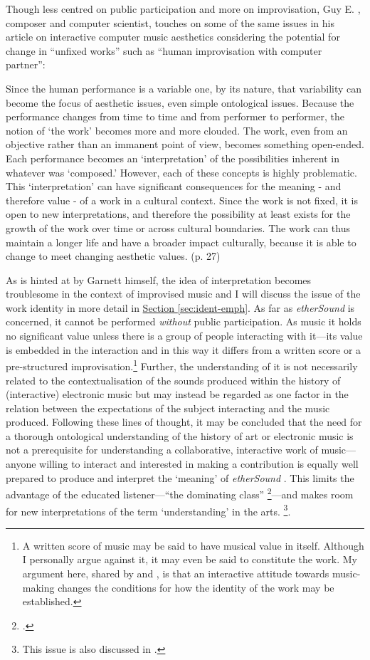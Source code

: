 Though less centred on public participation and more on improvisation, Guy E. \citeauthor{Garnett}, composer and computer scientist, touches on some of the same issues in his article on interactive computer music aesthetics considering the potential for change in ``unfixed works'' such as ``human improvisation with computer partner'': 
\begin{squote}   
Since the human performance is a variable one, by its nature, that  variability can become the focus of aesthetic issues, even simple  ontological issues. Because the performance changes from time to  time and from performer to performer, the notion of `the work'  becomes more and more clouded. The work, even from an objective  rather than an immanent point of view, becomes something open-ended.  Each performance becomes an `interpretation' of the possibilities  inherent in whatever was `composed.' However, each of these concepts  is highly problematic. This `interpretation' can have significant  consequences for the meaning - and therefore value - of a work in a  cultural context. Since the work is not fixed, it is open to new  interpretations, and therefore the possibility at least exists for  the growth of the work over time or across cultural boundaries. The  work can thus maintain a longer life and have a broader impact  culturally, because it is able to change to meet changing aesthetic  values. (p. 27) 
\end{squote} 
As is hinted at by Garnett himself, the idea of interpretation becomes troublesome in the context of improvised music and I will discuss the issue of the work identity in more detail in \hyperref[sec:ident-emph]{Section \ref*{sec:ident-emph}}. As far as \emph{etherSound} is concerned, it cannot be performed \emph{without} public participation. As music it holds no significant value unless there is a group of people interacting with it---its value is embedded in the interaction and in this way it differs from a written score or a pre-structured improvisation.\footnote{A written score of music may be said to have musical value in itself. Although I personally argue against it, it   may even be said to constitute the work. My argument here, shared by   \citeauthor{Ascott} and \citeauthor{Garnett}, is that an interactive   attitude towards music-making changes the conditions for how the   identity of the work may be established.}  Further, the understanding of it is not necessarily related to the contextualisation of the sounds produced within the history of (interactive) electronic music but may instead be regarded as one factor in the relation between the expectations of the subject interacting and the music produced.  Following these lines of thought, it may be concluded that the need for a thorough ontological understanding of the history of art or electronic music is not a prerequisite for understanding a collaborative, interactive work of music---anyone willing to interact and interested in making a contribution is equally well prepared to produce and interpret the `meaning' of \emph{etherSound} . This limits the advantage of the educated listener---``the dominating class'' \footcite{bourdieu}---and makes room for new interpretations of the term `understanding' in the arts. \footnote{This issue is also discussed in \cite{frisk05}.}. 

